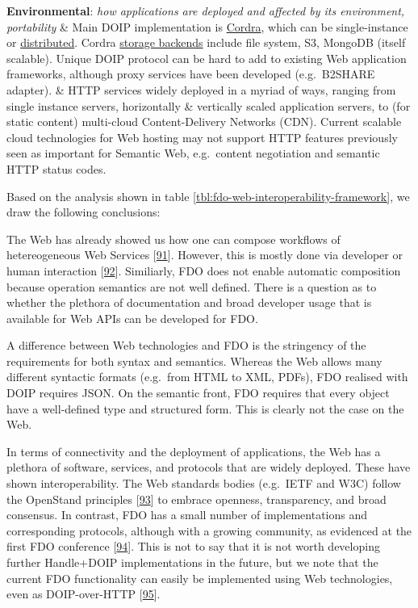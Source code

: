 \begin{longtable}[]
\textbf{Environmental}: \emph{how applications are deployed and affected by its environment, portability} & Main DOIP implementation is \href{https://www.cordra.org/}{Cordra}, which can be single-instance or \href{https://www.cordra.org/documentation/configuration/distributed-deployment.html}{distributed}. Cordra \href{https://www.cordra.org/documentation/configuration/storage-backends.html}{storage backends} include file system, S3, MongoDB (itself scalable). Unique DOIP protocol can be hard to add to existing Web application frameworks, although proxy services have been developed (e.g.~B2SHARE adapter). & HTTP services widely deployed in a myriad of ways, ranging from single instance servers, horizontally \& vertically scaled application servers, to (for static content) multi-cloud Content-Delivery Networks (CDN). Current scalable cloud technologies for Web hosting may not support HTTP features previously seen as important for Semantic Web, e.g.~content negotiation and semantic HTTP status codes. \\
\bottomrule
\end{longtable}

Based on the analysis shown in table \ref{tbl:fdo-web-interoperability-framework}, we draw the following conclusions:

The Web has already showed us how one can compose workflows of hetereogeneous Web Services {[}\protect\hyperlink{ref-39K3yHT3}{91}{]}. However, this is mostly done via developer or human interaction {[}\protect\hyperlink{ref-iYh1wFBt}{92}{]}. Similiarly, FDO does not enable automatic composition because operation semantics are not well defined. There is a question as to whether the plethora of documentation and broad developer usage that is available for Web APIs can be developed for FDO.

A difference between Web technologies and FDO is the stringency of the requirements for both syntax and semantics. Whereas the Web allows many different syntactic formats (e.g.~from HTML to XML, PDFs), FDO realised with DOIP requires JSON. On the semantic front, FDO requires that every object have a well-defined type and structured form. This is clearly not the case on the Web.

In terms of connectivity and the deployment of applications, the Web has a plethora of software, services, and protocols that are widely deployed. These have shown interoperability. The Web standards bodies (e.g.~IETF and W3C) follow the OpenStand principles {[}\protect\hyperlink{ref-hxtgCGjY}{93}{]} to embrace openness, transparency, and broad consensus. In contrast, FDO has a small number of implementations and corresponding protocols, although with a growing community, as evidenced at the first FDO conference {[}\protect\hyperlink{ref-jrZe6Esu}{94}{]}. This is not to say that it is not worth developing further Handle+DOIP implementations in the future, but we note that the current FDO functionality can easily be implemented using Web technologies, even as DOIP-over-HTTP {[}\protect\hyperlink{ref-p7nwRj8E}{95}{]}.

